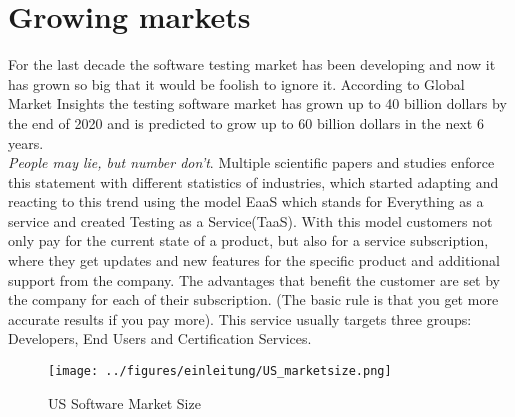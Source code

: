 \section{Growing markets}
For the last decade the software testing market has been developing and now it has grown so big that it would be foolish to ignore it. According to \dq Global Market Insights\dq{} the testing software market has grown up to 40 billion dollars by the end of 2020 and is predicted to grow up to 60 billion dollars in the next 6 years.\cite{GMI}\\
\textit{\dq People may lie, but number don't\dq}. Multiple scientific papers and studies enforce this statement with different statistics of industries, which started adapting and reacting to this trend using the model \dq EaaS \dq{} which stands for \dq Everything as a service\dq{} and created \dq Testing as a Service\dq{}(TaaS). With this model customers not only pay for the current state of a product, but also for a service subscription, where they get updates and new features for the specific product and additional support from the company. The advantages that benefit the customer are set by the company for each of their subscription. (The basic rule is that you get more accurate results if you pay more). This service usually targets three groups: Developers, End Users and Certification Services.\cite{10.1145/1807128.1807153} 
\begin{figure}[htbp]
	\centering
	\texttt{[image: ../figures/einleitung/US\_marketsize.png]}
	\caption{US Software Market Size\cite{GMI}}
	\label{US_marketsize_graph}
\end{figure}

